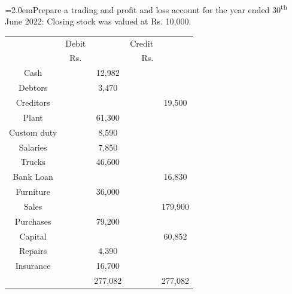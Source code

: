 \documentclass[11pt,a4paper]{article}
\newcommand{\lqn}[2]{\Needspace{6\baselineskip}\par\medskip\noindent\hangindent=2.0em\hangafter=1\makebox[2.0em][l]{\textbf{#1.}}#2\par}
\begin{document}
\lqn{88}{Prepare a trading and profit and loss account for the year ended 30\textsuperscript{th}  June 2022: Closing stock was valued at Rs. 10,000.\par
\par\smallskip\noindent\hspace*{1.2em}\begin{tabular}{|cccrc|}
\hline
 & Debit &  & Credit &  \\
 & Rs. &  & Rs. &  \\
Cash &  & 12,982 &  &  \\
Debtors &  & 3,470 &  &  \\
Creditors &  &  &  & 19,500 \\
Plant &  & 61,300 &  &  \\
Custom duty &  & 8,590 &  &  \\
Salaries &  & 7,850 &  &  \\
Trucks &  & 46,600 &  &  \\
Bank Loan &  &  &  & 16,830 \\
Furniture &  & 36,000 &  &  \\
Sales &  &  &  & 179,900 \\
Purchases &  & 79,200 &  &  \\
Capital &  &  &  & 60,852 \\
Repairs &  & 4,390 &  &  \\
Insurance &  & 16,700 &  &  \\
 &  & 277,082 &  & 277,082 \\
\hline
\end{tabular}\par\smallskip
}
\end{document}
